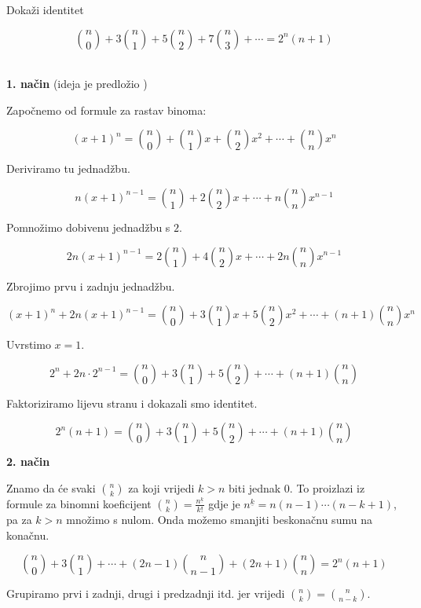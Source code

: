 \documentclass[exam.tex]{subfiles}
\begin{document}
	\begin{task}
		Dokaži identitet
	
		\[ \binom{n}{0} + 3 \binom{n}{1} + 5 \binom{n}{2} + 7 \binom{n}{3} + \cdots = 2^n (n + 1) \] \\[1em]
	\end{task}

	\textbf{1. način} (ideja je predložio \UkiseljeniKrastavac)
	
	Započnemo od formule za rastav binoma:
	
	\[ (x + 1)^n = \binom{n}{0} + \binom{n}{1} x + \binom{n}{2} x^2 + \cdots + \binom{n}{n} x^n \]
	
	Deriviramo tu jednadžbu.
	
	\[ n (x + 1)^{n - 1} = \binom{n}{1} + 2 \binom{n}{2} x + \cdots + n \binom{n}{n} x^{n - 1} \]
	
	Pomnožimo dobivenu jednadžbu s \( 2 \).
	
	\[ 2 n (x + 1)^{n - 1} = 2 \binom{n}{1} + 4 \binom{n}{2} x + \cdots + 2 n \binom{n}{n} x^{n - 1} \]
	
	Zbrojimo prvu i zadnju jednadžbu.
	
	\[ (x + 1)^n + 2 n (x + 1)^{n - 1} = \binom{n}{0} + 3 \binom{n}{1} x + 5 \binom{n}{2} x^2 + \cdots + (n + 1) \binom{n}{n} x^n \]
	
	Uvrstimo \( x = 1 \).
	
	\[ 2^n + 2 n \cdot 2^{n - 1} = \binom{n}{0} + 3 \binom{n}{1} + 5 \binom{n}{2} + \cdots + (n + 1) \binom{n}{n} \]
	
	Faktoriziramo lijevu stranu i dokazali smo identitet.
	
	\[ 2^n (n + 1) = \binom{n}{0} + 3 \binom{n}{1} + 5 \binom{n}{2} + \cdots + (n + 1) \binom{n}{n} \] 
	
	\textbf{2. način}
	
	Znamo da će svaki \( \displaystyle \binom{n}{k} \) za koji vrijedi \( k > n \) biti jednak 0. To proizlazi iz formule za binomni koeficijent \( \displaystyle \binom{n}{k} = \frac{n^{\underline{k}}}{k!} \) gdje je \( n^{\underline{k}} = n (n - 1) \cdots (n - k + 1) \), pa za \( k > n\) množimo s nulom. Onda možemo smanjiti beskonačnu sumu na konačnu.
	
	\[ \binom{n}{0} + 3 \binom{n}{1} + \cdots + (2n - 1) \binom{n}{n - 1} + (2n + 1) \binom{n}{n} = 2^n (n + 1) \]
	
	Grupiramo prvi i zadnji, drugi i predzadnji itd. jer vrijedi \( \binom{n}{k} = \binom{n}{n - k} \). \\
	
\end{document}
